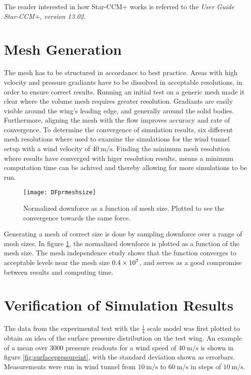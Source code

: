   The reader interested in how Star-CCM+ works is referred to the \emph{User Guide Star-CCM+, version 13.02}.

\section{Mesh Generation}
\label{sec:mesh}

  The mesh has to be structured in accordance to best practice. Areas with high velocity and pressure gradiants have to be dissolved in acceptable resolutions, in order to ensure correct results. Running an initial test on a generic mesh made it clear where the volume mesh requires greater resolution. Gradiants are easily visible around the wing's leading edge, and generally around the solid bodies. Furthermore, aligning the mesh with the flow improves accuracy and rate of convergence. To determine the convergence of simulation results, six different mesh resolutions where used to examine the simulations for the wind tunnel setup with a wind velocity of $\SI{40}{\metre\per\second}$. Finding the minimum mesh resolution where results have converged with higer resolution results, means a minimum computation time can be achived and thereby allowing for more simulations to be run.

  \begin{figure}
    \texttt{[image: DFprmeshsize]}
    \caption{Normalized downforce as a function of mesh size. Plotted to see the convergence towards the same force.}
    \label{fig:DFprmeshsize}
  \end{figure}

  Generating a mesh of correct size is done by sampling downforce over a range of mesh sizes. In figure \ref{fig:DFprmeshsize}, the normalized downforce is plotted as a function of the mesh size. The mesh independence study shows that the function converges to acceptable levels near the mesh size $\SI{.4E7}{}$, and serves as a good compromise between results and computing time.

  \section{Verification of Simulation Results}
  \label{sec:simulationcomparison}

  The data from the experimental test with the $\frac{1}{4}$ scale model was first plotted to obtain an idea of the surface pressure distribution on the test wing. An example of a mean over 3000 pressure readouts for a wind speed of $\SI{40}{\metre\per\second}$ is shown in figure \ref{fig:surfacepressureint}, with the standard deviation shown as errorbars. Measurements were run in wind tunnel from $\SI{10}{\metre\per\second}$ to $\SI{60}{\metre\per\second}$ in steps of $\SI{10}{\metre\per\second}$.

